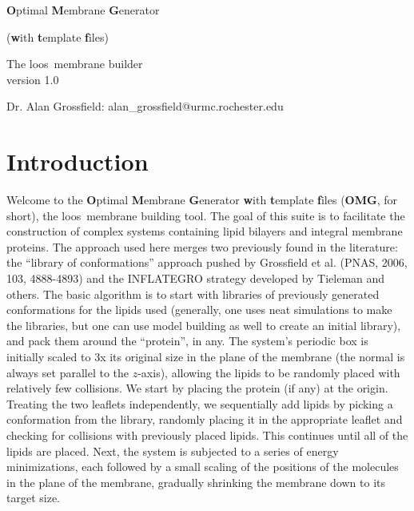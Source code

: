 \documentclass[12pt]{article}
\begin{document}
\newcommand{\loos}{{\sc loos}}
\newcommand{\pyloos}{{\sc PyLoos}}
\newcommand{\namd}{{\sc namd}}
\newcommand{\psfgen}{{\tt psfgen}}
\newcommand{\omgwtf}{{\bf OMG}}
\newcommand{\highlight}[1]{\textcolor{red}{#1}}


\begin{center}
\begin{LARGE}
{\bf O}ptimal {\bf M}embrane {\bf G}enerator \\
\end{LARGE}
\begin{Large}
({\bf w}ith  {\bf t}emplate {\bf f}iles) \\
\end{Large}
\vspace*{0.25in}
\begin{large}
The \loos\ membrane builder \\
version 1.0 \\
\end{large}

\vspace*{0.5in}
Dr. Alan Grossfield: alan\_grossfield@urmc.rochester.edu \\
\end{center}

\newpage

\tableofcontents
\newpage

\section{Introduction}
\label{s:intro}

Welcome to the {\bf O}ptimal {\bf M}embrane {\bf G}enerator {\bf w}ith {\bf
t}emplate {\bf f}iles (\omgwtf, for short), the \loos\ membrane building
tool.  The goal of this suite is to facilitate the construction of complex
systems containing lipid bilayers and integral membrane proteins.  The
approach used here merges two previously found in the literature: the
``library of conformations'' approach pushed by Grossfield et al. (PNAS,
2006, 103, 4888-4893) and the INFLATEGRO strategy developed by Tieleman and
others.  The basic algorithm is to start with libraries of previously
generated conformations for the lipids used (generally, one uses neat
simulations to make the libraries, but one can use model building as well
to create an initial library), and pack them around the ``protein'', in
any.  The system's periodic box is initially scaled to 3x its original size in
the plane of the membrane (the normal is always set parallel to the
$z$-axis), allowing the lipids to be randomly placed with relatively few
collisions.  We start by placing the protein (if any) at the origin.
Treating the two leaflets independently, we sequentially add lipids by
picking a conformation from the library, randomly placing it in the
appropriate leaflet and checking for collisions with previously placed
lipids.  This continues until all of the lipids are placed.  Next, the
system is subjected to a series of energy minimizations, each followed by a
small scaling of the positions of the molecules in the plane of the
membrane, gradually shrinking the membrane down to its target size.
\end{document}
